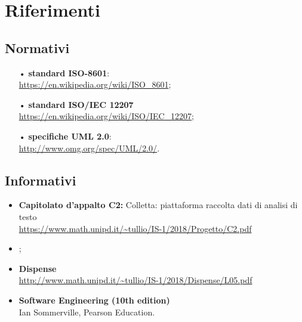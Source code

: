 \section{Riferimenti}

\subsection{Normativi}
\begin{itemize}
\item[•]\textbf{standard {ISO}-8601}:\\
\url{https://en.wikipedia.org/wiki/ISO_8601};
\item[•]\textbf{standard ISO/{IEC} 12207}\\
\url{https://en.wikipedia.org/wiki/ISO/IEC_12207};
\item[•]\textbf{specifiche {UML} 2.0}:\\
\url{http://www.omg.org/spec/UML/2.0/}.

\end{itemize} 
\subsection{Informativi}
\begin{itemize}
\item \textbf{Capitolato d’appalto C2:} Colletta: piattaforma raccolta dati di analisi di testo\\
\url{https://www.math.unipd.it/~tullio/IS-1/2018/Progetto/C2.pdf}
\item \textbf{\PdP};
\item \textbf{Dispense} \\
\url{http://www.math.unipd.it/~tullio/IS-1/2018/Dispense/L05.pdf}
\item \textbf{Software Engineering (10th edition)}\\ Ian Sommerville, Pearson Education.

\end{itemize}
